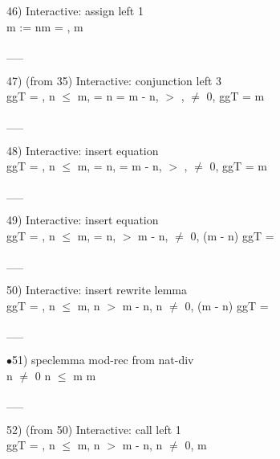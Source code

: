 \documentclass[a4paper]{article}
\begin{document}
46) Interactive: assign left  1\\
\Do m := n\Dc m = , m %

\vspace{-1.5ex}\_\hrulefill \_

47)  (from 35) Interactive: conjunction left  3\\
\tabf \Do ggT\Dc {} = , n $\le$ m,  = n \And {} = m - n, \Not {} $>$ ,  $\neq$ 0,  %
\Fol \Do ggT\Dc {} = m

\vspace{-1.5ex}\_\hrulefill \_

48) Interactive: insert equation \\
\tabf \Do ggT\Dc {} = , n $\le$ m,  = n,  = m - n, \Not {} $>$ ,  $\neq$ 0,  %
\Fol \Do ggT\Dc {} = m

\vspace{-1.5ex}\_\hrulefill \_

49) Interactive: insert equation \\
\tabf \Do ggT\Dc {} = , n $\le$ m,  = n, \Not {} $>$ m - n,  $\neq$ 0, (m - n) %
\Fol \Do ggT\Dc {} = 

\vspace{-1.5ex}\_\hrulefill \_

50) Interactive: insert rewrite lemma \\
\tabf \Do ggT\Dc {} = , n $\le$ m, \Not n $>$ m - n, n $\neq$ 0, (m - n) %
\Fol \Do ggT\Dc {} = 

\vspace{-1.5ex}\_\hrulefill \_

$\bullet$51) speclemma mod-rec from nat-div \\
n $\neq$ 0 \Fol n $\le$ m \Imp m %

\vspace{-1.5ex}\_\hrulefill \_

52)  (from 50) Interactive: call left  1\\
\Do ggT\Dc {} = , n $\le$ m, \Not n $>$ m - n, n $\neq$ 0, m %
\end{document}
